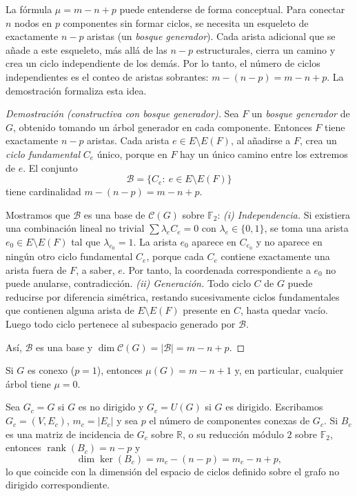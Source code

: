             La fórmula $\mu = m-n+p$ puede entenderse de forma conceptual. Para conectar $n$ nodos en $p$ componentes sin formar ciclos, se necesita un esqueleto de exactamente $n-p$ aristas (un \textit{bosque generador}). Cada arista adicional que se añade a este esqueleto, más allá de las $n-p$ estructurales, cierra un camino y crea un ciclo independiente de los demás. Por lo tanto, el número de ciclos independientes es el conteo de aristas sobrantes: $m - (n-p) = m-n+p$. La demostración formaliza esta idea.

            \begin{proof}[Demostración (constructiva con bosque generador)]
                Sea $F$ un \emph{bosque generador} de $G$, obtenido tomando un árbol generador en cada componente. Entonces $F$ tiene exactamente $n-p$ aristas.
                Cada arista $e\in E\setminus E(F)$, al añadirse a $F$, crea un \emph{ciclo fundamental} $C_e$ único, porque en $F$ hay un único camino entre los extremos de $e$. El conjunto
                \[
                \mathcal{B}=\{C_e:\ e\in E\setminus E(F)\}
                \]
                tiene cardinalidad $m-(n-p)=m-n+p$.

                Mostramos que $\mathcal{B}$ es una base de $\mathcal{C}(G)$ sobre $\mathbb{F}_2$:
                \emph{(i) Independencia.} Si existiera una combinación lineal no trivial $\sum \lambda_e C_e=0$ con $\lambda_e\in\{0,1\}$, se toma una arista $e_0\in E\setminus E(F)$ tal que $\lambda_{e_0}=1$. La arista $e_0$ aparece en $C_{e_0}$ y no aparece en ningún otro ciclo fundamental $C_e$, porque cada $C_e$ contiene exactamente una arista fuera de $F$, a saber, $e$. Por tanto, la coordenada correspondiente a $e_0$ no puede anularse, contradicción. \emph{(ii) Generación.} Todo ciclo $C$ de $G$ puede reducirse por diferencia simétrica, restando sucesivamente ciclos fundamentales que contienen alguna arista de $E\setminus E(F)$ presente en $C$, hasta quedar vacío. Luego todo ciclo pertenece al subespacio generado por $\mathcal{B}$.

                Así, $\mathcal{B}$ es una base y $\dim\mathcal{C}(G)=|\mathcal{B}|=m-n+p$.
            \end{proof}

            \begin{corolario}
                Si $G$ es conexo ($p=1$), entonces $\mu(G)=m-n+1$ y, en particular, cualquier árbol tiene $\mu=0$.
            \end{corolario}

            \begin{observacion}
                Sea $G_c=G$ si $G$ es no dirigido y $G_c=U(G)$ si $G$ es dirigido. Escribamos $G_c=(V,E_c)$, $m_c=|E_c|$ y sea $p$ el número de componentes conexas de $G_c$. Si $B_c$ es una matriz de incidencia de $G_c$ sobre $\mathbb{R}$, o su reducción módulo $2$ sobre $\mathbb{F}_2$, entonces $\operatorname{rank}(B_c)=n-p$ y
                \[
                \dim \ker(B_c)=m_c-(n-p)=m_c-n+p,
                \]
                lo que coincide con la dimensión del espacio de ciclos definido sobre el grafo no dirigido correspondiente.
            \end{observacion}

